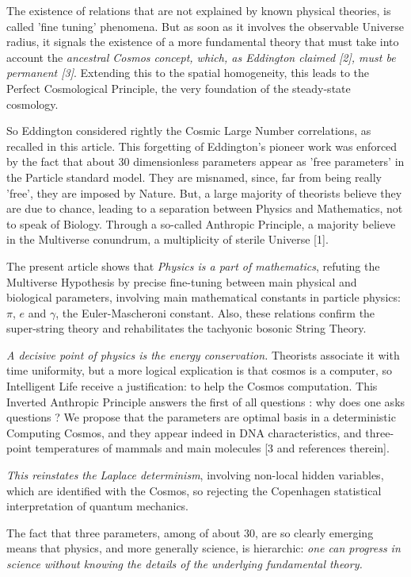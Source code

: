 \documentclass[twoside,draft]{article}
\begin{document}
\begin{sloppypar}
{The existence of relations that are not explained by known physical theories, is called 'fine tuning' phenomena. But as soon as it involves the observable Universe radius, it signals the existence of a more fundamental theory that must take into account the \textit{ancestral Cosmos concept, which, as Eddington claimed [2], must be permanent [3]}. Extending this to the spatial homogeneity, this leads to the Perfect Cosmological Principle, the very foundation of the steady-state cosmology.

 So Eddington considered rightly the Cosmic Large Number correlations, as recalled in this article. This forgetting of Eddington's pioneer work was enforced by the fact that about 30 dimensionless parameters appear as  'free parameters' in the Particle standard model. They are misnamed, since, far from being really 'free', they are imposed by Nature. But, a large majority of theorists believe they are due to chance, leading to a separation between Physics and Mathematics, not to speak of Biology. Through a so-called Anthropic Principle, a majority believe in the Multiverse conundrum, a multiplicity of sterile Universe [1].

The present article shows that \textit{Physics is a part of mathematics}, refuting the Multiverse Hypothesis by precise fine-tuning between main physical and biological parameters, involving main mathematical constants in particle physics: $\pi$,  $e$ and $\gamma$, the Euler-Mascheroni constant. Also, these relations confirm the super-string theory and rehabilitates the tachyonic bosonic String Theory.

\textit{A decisive point of physics is the energy conservation.} Theorists associate it with time uniformity, but a more logical explication is that cosmos is a computer, so Intelligent Life receive a justification: to help the Cosmos computation. This Inverted Anthropic Principle answers the first of all questions : why does one asks questions ? We propose that the parameters are optimal basis in a deterministic Computing Cosmos, and they appear indeed in DNA characteristics, and three-point temperatures of mammals and main molecules [3 and references therein].

\textit{This reinstates the Laplace determinism}, involving non-local hidden variables, which are identified with the Cosmos, so rejecting the Copenhagen statistical interpretation of quantum mechanics.

The fact that three parameters, among of about 30, are so clearly emerging means that physics, and more generally science, is hierarchic: \textit{one can progress in science without knowing the details of the underlying fundamental theory.}

}
\end{sloppypar}
\end{document}
